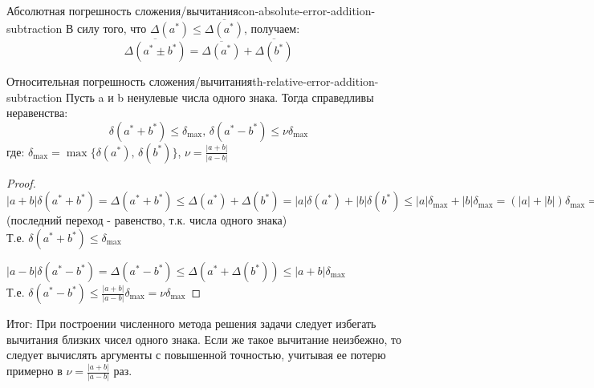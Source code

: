 \documentclass[14pt]{extarticle}
\begin{document}
        \begin{consequence}{Абсолютная погрешность сложения/вычитания}{con-absolute-error-addition-subtraction}
            В силу того, что $\Delta(a^{*}) \leq \overline{\Delta(a^{*})}$, получаем:
            $$\overline{\Delta(a^{*} \pm b^{*})} = \overline{\Delta(a^{*})} + \overline{\Delta(b^{*})}$$
        \end{consequence}

        \begin{theorem}{Относительная погрешность сложения/вычитания}{th-relative-error-addition-subtraction}
            Пусть a и b ненулевые числа одного знака. Тогда справедливы неравенства:
            $$\delta(a^{*} + b^{*}) \leq \delta_{\max} \text{, } \delta(a^{*} - b^{*}) \leq \nu \delta_{\max}$$
            где: $\delta_{\max} = \max\{\delta(a^{*}) \text{, } \delta(b^{*})\}$, $\nu = \frac{|a + b|}{|a - b|}$
        
            \vspace{\baselineskip}

            \begin{proof}
                $|a + b|\delta(a^{*} + b^{*}) = \Delta(a^{*} + b^{*}) \leq \Delta(a^{*}) + \Delta(b^{*}) = |a|\delta(a^{*}) + |b|\delta(b^{*}) \leq |a|\delta_{\max} + |b|\delta_{\max} = (|a| + |b|)\delta_{\max} = |a + b|\delta_{\max}$ (последний переход - равенство, т.к. числа одного знака)\\
                Т.е. $\delta(a^{*} + b^{*}) \leq \delta_{\max}$

                \vspace{\baselineskip}

                $|a - b|\delta(a^{*} - b^{*}) = \Delta(a^{*} - b^{*}) \leq \Delta(a^{*} + \Delta(b^{*})) \leq |a + b| \delta_{\max}$\\
                Т.е. $\delta(a^{*} - b^{*}) \leq \frac{|a + b|}{|a -b|}\delta_{\max} = \nu \delta_{\max}$
            \end{proof}
        \end{theorem}

        Итог: При построении численного метода решения задачи следует избегать вычитания близких чисел одного знака. Если же такое вычитание неизбежно, то следует вычислять  аргументы  с  повышенной  точностью,  учитывая  ее  потерю примерно в $\nu = \frac{|a+b|}{|a-b|}$ раз.
\end{document}
